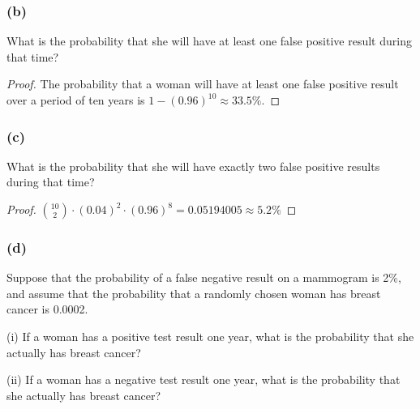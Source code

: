 \documentclass[14pt]{extarticle}
\begin{document}
\subsubsection{(b)}
What is the probability that she will have at least one false positive result during that time?

\begin{proof}
The probability that a woman will have at least one false positive result over a period of ten years is 
\(1 - (0.96)^{10} \approx 33.5\%\).
\end{proof}

\subsubsection{(c)}
What is the probability that she will have exactly two false positive results during that time?

\begin{proof}
\(\binom{10}{2} \cdot (0.04)^{2} \cdot (0.96)^{8} = 0.05194005 \approx 5.2\%\)
\end{proof}

\subsubsection{(d)}
Suppose that the probability of a false negative result on a mammogram is 2\%, and assume that the probability that a 
randomly chosen woman has breast cancer is 0.0002.

(i) If a woman has a positive test result one year, what is the probability that she actually has breast cancer?

(ii) If a woman has a negative test result one year, what is the probability that she actually has breast cancer?
\end{document}
